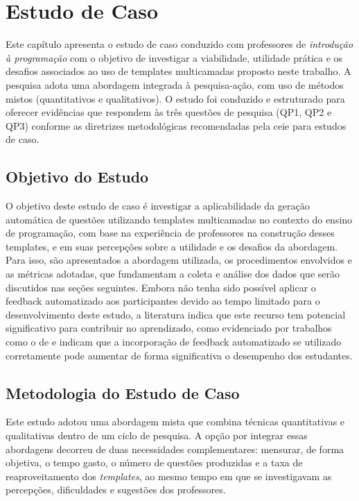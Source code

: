 \chapter{Estudo de Caso}
Este capítulo apresenta o estudo de caso conduzido com professores de \textit{introdução à programação} com o objetivo de investigar a viabilidade, utilidade prática e os desafios associados ao uso de templates multicamadas proposto neste trabalho. A pesquisa adota uma abordagem integrada à pesquisa-ação, com uso de métodos mistos (quantitativos e qualitativos). O estudo foi conduzido e estruturado para oferecer evidências que respondem às três questões de pesquisa (QP1, QP2 e QP3) conforme as diretrizes metodológicas recomendadas pela \gls{ceie} para estudos de caso.

\section{Objetivo do Estudo}
O objetivo deste estudo de caso é investigar a aplicabilidade da geração automática de questões utilizando templates multicamadas no contexto do ensino de programação, com base na experiência de professores na construção desses templates, e em suas percepções sobre a utilidade e os desafios da abordagem. Para isso, são apresentados a abordagem utilizada,  os procedimentos envolvidos e as métricas adotadas, que fundamentam a coleta e análise dos dados que serão discutidos nas seções seguintes.
Embora não tenha sido possível aplicar o feedback automatizado aos participantes devido ao tempo limitado para o desenvolvimento deste estudo, a literatura  indica que este recurso tem potencial significativo para contribuir no aprendizado, como evidenciado por trabalhos como o de \parencite{vanpraet2024} e \parencite{fung2024} indicam que a incorporação de feedback automatizado se utilizado corretamente pode aumentar de forma significativa o desempenho dos estudantes.

\section{Metodologia do Estudo de Caso}

Este estudo adotou uma abordagem mista que combina técnicas quantitativas e qualitativas dentro de um ciclo de pesquisa. A opção por integrar essas abordagens decorreu de duas necessidades complementares: mensurar, de forma objetiva, o tempo gasto, o número de questões produzidas e a taxa de reaproveitamento dos \textit{templates}, ao mesmo tempo em que se investigavam as percepções, dificuldades e sugestões dos professores.


